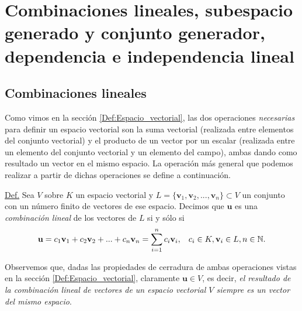 \documentclass[apuntes]{subfiles}
\begin{document}
\section{Combinaciones lineales, subespacio generado y conjunto generador, dependencia e independencia lineal} \label{Sec:3}

\subsection*{Combinaciones lineales} \label{Subsec:Combinaciones_lineales}

Como vimos en la sección \ref{Def:Espacio_vectorial}, las dos operaciones \emph{necesarias} para definir un espacio vectorial son la suma vectorial (realizada entre elementos del conjunto vectorial) y el producto de un vector por un escalar (realizada entre un elemento del conjunto vectorial y un elemento del campo), ambas dando como resultado un vector en el mismo espacio. La operación más general que podemos realizar a partir de dichas operaciones se define a continuación.

\begin{tcolorbox}
    \underline{Def.} Sea $V$ sobre $K$ un espacio vectorial y $L=\{\mathbf{v}_1, \mathbf{v}_2, ..., \mathbf{v}_n\}\subset V$ un conjunto con un número finito de vectores de ese espacio. Decimos que $\mathbf{u}$ es una \emph{combinación lineal} de los vectores de $L$ si y sólo si $$\mathbf{u} =c_1\mathbf{v}_1+c_2\mathbf{v}_2+...+c_n\mathbf{v}_n=\sum_{i=1}^n c_i\mathbf{v}_i,\hspace{3mm}c_i\in K, \mathbf{v}_i\in L, n\in \mathbb{N}.$$

    Observemos que, dadas las propiedades de cerradura de ambas operaciones vistas en la sección \ref{Def:Espacio_vectorial}, claramente $\mathbf{u} \in V$, es decir, \emph{el resultado de la combinación lineal de vectores de un espacio vectorial $V$ siempre es un vector del mismo espacio}. 
\end{tcolorbox}
\end{document}
